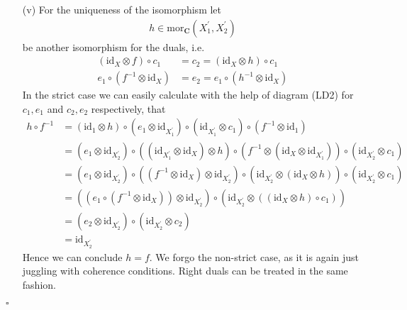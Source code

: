 \begin{prf}
\begin{enumerate}
\item[(v)]
For the uniqueness of the isomorphism let
\begin{align*}
  h
  \in
  \mathrm{mor}_{\mathbf{C}}(X_{1}^{\prime},X_{2}^{\prime})
\end{align*}
be another isomorphism for the duals, i.e.
\begin{align*}
  (\mathrm{id}_{X} \otimes f)
  \circ
  c_{1}
  &=
  c_{2}
  =
  (\mathrm{id}_{X} \otimes h)
  \circ
  c_{1}
  \\
  e_{1}
  \circ
  (f^{-1} \otimes \mathrm{id}_{X})
  &=
  e_{2}
  =
  e_{1}
  \circ
  (h^{-1} \otimes \mathrm{id}_{X})
\end{align*}
In the strict case we can easily calculate with the help of diagram (LD2) for $c_{1},e_{1}$ and $c_{2},e_{2}$ respectively, that
\begin{align*}
  h
  \circ
  f^{-1}
  &=
  \left(
    \mathrm{id}_{1}
    \otimes
    h
  \right)
  \circ
  \left(
    e_{1}
    \otimes
    \mathrm{id}_{X_{1}^{\prime}}
  \right)
  \circ
  \left(
    \mathrm{id}_{X_{1}^{\prime}}
    \otimes
    c_{1}
  \right)
  \circ
  \left(
    f^{-1}
    \otimes
    \mathrm{id}_{1}
  \right)
  \\
  &=
  \left(
    e_{1}
    \otimes
    \mathrm{id}_{X_{2}^{\prime}}
  \right)
  \circ
  \left(
    \left(
      \mathrm{id}_{X_{1}^{\prime}}
      \otimes
      \mathrm{id}_{X}
    \right)
    \otimes
    h
  \right)
  \circ
  \left(
    f^{-1}
    \otimes
    \left(
      \mathrm{id}_{X}
      \otimes
      \mathrm{id}_{X_{1}^{\prime}}
    \right)
  \right)
  \circ
  \left(
    \mathrm{id}_{X_{2}^{\prime}}
    \otimes
    c_{1}
  \right)
  \\
  &=
  \left(
    e_{1}
    \otimes
    \mathrm{id}_{X_{2}^{\prime}}
  \right)
  \circ
  \left(
    \left(
      f^{-1}
      \otimes
      \mathrm{id}_{X}
    \right)
    \otimes
    \mathrm{id}_{X_{2}^{\prime}}
  \right)
  \circ
  \left(
    \mathrm{id}_{X_{2}^{\prime}}
    \otimes
    \left(
      \mathrm{id}_{X}
      \otimes
      h
    \right)
  \right)
  \circ
  \left(
    \mathrm{id}_{X_{2}^{\prime}}
    \otimes
    c_{1}
  \right)
  \\
  &=
  \left(
    \left(
      e_{1}
      \circ
      \left(
        f^{-1}
        \otimes
        \mathrm{id}_{X}
      \right)
    \right)
    \otimes
    \mathrm{id}_{X_{2}^{\prime}}
  \right)
  \circ
  \left(
    \mathrm{id}_{X_{2}^{\prime}}
    \otimes
    \left(
      \left(
        \mathrm{id}_{X}
        \otimes
        h
      \right)
      \circ
      c_{1}
    \right)
  \right)
  \\
  &=
  \left(
    e_{2}
    \otimes
    \mathrm{id}_{X_{2}^{\prime}}
  \right)
  \circ
  \left(
    \mathrm{id}_{X_{2}^{\prime}}
    \otimes
    c_{2}
  \right)
  \\
  &=
  \mathrm{id}_{X_{2}^{\prime}}
\end{align*}
Hence we can conclude $h = f$. We forgo the non-strict case, as it is again just juggling with coherence conditions. Right duals can be treated in the same fashion.
\end{enumerate}
\phantom{proven}
\hfill
$\square$
\end{prf}
